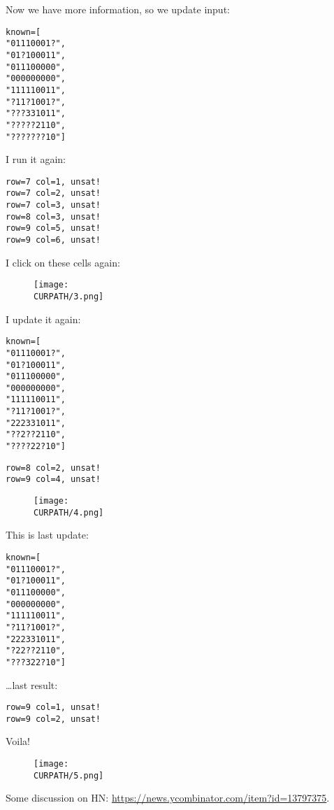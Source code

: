 Now we have more information, so we update input:

\begin{lstlisting}
known=[
"01110001?",
"01?100011",
"011100000",
"000000000",
"111110011",
"?11?1001?",
"???331011",
"?????2110",
"???????10"]
\end{lstlisting}

I run it again:

\begin{lstlisting}
row=7 col=1, unsat!
row=7 col=2, unsat!
row=7 col=3, unsat!
row=8 col=3, unsat!
row=9 col=5, unsat!
row=9 col=6, unsat!
\end{lstlisting}

I click on these cells again:

\begin{figure}[H]
\centering
\texttt{[image: \\CURPATH/3.png]}
\end{figure}

I update it again:

\begin{lstlisting}
known=[
"01110001?",
"01?100011",
"011100000",
"000000000",
"111110011",
"?11?1001?",
"222331011",
"??2??2110",
"????22?10"]
\end{lstlisting}

\begin{lstlisting}
row=8 col=2, unsat!
row=9 col=4, unsat!
\end{lstlisting}

\begin{figure}[H]
\centering
\texttt{[image: \\CURPATH/4.png]}
\end{figure}

This is last update:

\begin{lstlisting}
known=[
"01110001?",
"01?100011",
"011100000",
"000000000",
"111110011",
"?11?1001?",
"222331011",
"?22??2110",
"???322?10"]
\end{lstlisting}

\dots last result:

\begin{lstlisting}
row=9 col=1, unsat!
row=9 col=2, unsat!
\end{lstlisting}

Voila!

\begin{figure}[H]
\centering
\texttt{[image: \\CURPATH/5.png]}
\end{figure}

Some discussion on HN: \url{https://news.ycombinator.com/item?id=13797375}.

